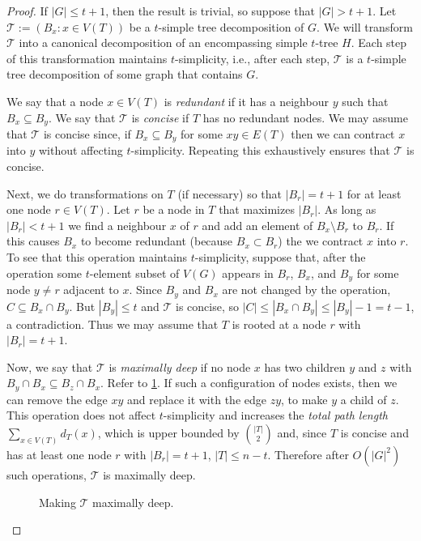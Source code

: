 \documentclass[kpfonts]{patmorin}
\theoremstyle{named}
\begin{document}
\begin{proof}
    If $|G|\le t+1$, then the result is trivial, so suppose that $|G|>t+1$. Let $\mathcal{T}:=(B_x:x\in V(T))$ be a $t$-simple tree decomposition of $G$. We will transform $\mathcal{T}$ into a canonical decomposition of an encompassing simple $t$-tree $H$. Each step of this transformation maintains $t$-simplicity, i.e., after each step, $\mathcal{T}$ is a $t$-simple tree decomposition of some graph that contains $G$.

    We say that a node $x\in V(T)$ is \emph{redundant} if it has a neighbour $y$ such that $B_x\subseteq B_y$.  We say that $\mathcal{T}$ is \emph{concise} if $T$ has no redundant nodes.  We may assume that $\mathcal{T}$ is concise since,  if $B_x\subseteq B_y$ for some $xy\in E(T)$ then we can contract $x$ into $y$ without affecting $t$-simplicity.  Repeating this exhaustively ensures that $\mathcal{T}$ is concise.

    Next, we do transformations on $T$ (if necessary) so that $|B_r|=t+1$ for at least one node $r\in V(T)$. Let $r$ be a node in $T$ that maximizes $|B_r|$. As long as $|B_r|<t+1$ we find a neighbour $x$ of $r$ and add an element of $B_x\setminus B_r$ to $B_r$.  If this causes $B_x$ to become redundant (because $B_x\subset B_r$) the we contract $x$ into $r$.  To see that this operation maintains $t$-simplicity, suppose that, after the operation some $t$-element subset of $V(G)$ appears in $B_r$, $B_x$, and $B_y$ for some node $y\neq r$ adjacent to $x$.  Since $B_y$ and $B_x$ are not changed by the operation, $C\subseteq B_x\cap B_y$.  But $|B_y|\le t$ and $\mathcal{T}$ is concise, so $|C|\le|B_x\cap B_y|\le|B_y|-1= t-1$, a contradiction. Thus we may assume that $T$ is rooted at a node $r$ with $|B_r|=t+1$.

    Now, we say that $\mathcal{T}$ is \emph{maximally deep} if no node $x$ has two children $y$ and $z$ with $B_y\cap B_x\subseteq B_z\cap B_x$.  Refer to \cref{maximal}.  If such a configuration of nodes exists, then we can remove the edge $xy$ and replace it with the edge $zy$, to make $y$ a child of $z$.  This operation does not affect $t$-simplicity and increases the \emph{total path length} $\sum_{x\in V(T)} d_T(x)$, which is upper bounded by $\binom{|T|}{2}$ and, since $T$ is concise and has at least one node $r$ with $|B_r|=t+1$, $|T|\le n-t$.  Therefore after $O(|G|^2)$ such operations, $\mathcal{T}$ is maximally deep.

    \begin{figure}
        \caption{Making $\mathcal{T}$ maximally deep.}
        \label{maximal}
    \end{figure}


\end{proof}
\end{document}
